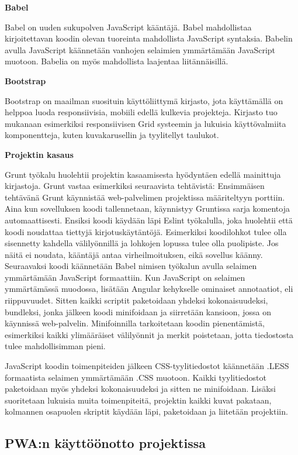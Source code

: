 \documentclass{tktltiki}
\begin{document}
\textbf{Babel}

Babel on uuden sukupolven JavaScript kääntäjä. Babel mahdollistaa kirjoitettavan koodin olevan tuoreinta mahdollista JavaScript syntaksia. Babelin avulla JavaScript käännetään vanhojen selaimien ymmärtämään JavaScript muotoon. Babelia on myös mahdollista laajentaa liitännäisillä.

\textbf{Bootstrap}

Bootstrap on maailman suosituin käyttöliittymä kirjasto, jota käyttämällä on helppoa luoda responsiivisia, mobiili edellä kulkevia projekteja. Kirjasto tuo mukanaan esimerkiksi responsiivisen Grid systeemin ja lukuisia käyttövalmiita komponentteja, kuten kuvakarusellin ja tyylitellyt taulukot. 

\textbf{Projektin kasaus}

Grunt työkalu huolehtii projektin kasaamisesta hyödyntäen edellä mainittuja kirjastoja. Grunt vastaa esimerkiksi seuraavista tehtävistä: Ensimmäisen tehtävänä Grunt käynnistää web-palvelimen projektissa määriteltyyn porttiin. Aina kun sovelluksen koodi tallennetaan, käynnistyy Gruntissa sarja komentoja automaattisesti. Ensiksi koodi käydään läpi Eslint työkalulla, joka huolehtii että koodi noudattaa tiettyjä kirjotuskäytäntöjä. Esimerkiksi koodilohkot tulee olla sisennetty kahdella välilyönnillä ja lohkojen lopussa tulee olla puolipiste. Jos näitä ei noudata, kääntäjä antaa virheilmoituksen, eikä sovellus käänny. Seuraavaksi koodi käännetään Babel nimisen työkalun avulla selaimen ymmärtämään JavaScript formaattiin. Kun JavaScript on selaimen ymmärtämässä muodossa, lisätään Angular kehykselle ominaiset annotaatiot, eli riippuvuudet. Sitten kaikki scriptit paketoidaan yhdeksi kokonaisuudeksi, bundleksi, jonka jälkeen koodi minifoidaan ja siirretään kansioon, jossa on käynnissä web-palvelin. Minifoinnilla tarkoitetaan koodin pienentämistä, esimerkiksi kaikki ylimääräiset välilyönnit ja merkit poistetaan, jotta tiedostosta tulee mahdollisimman pieni.

JavaScript koodin toimenpiteiden jälkeen CSS-tyylitiedostot käännetään .LESS formaatista selaimen ymmärtämään .CSS muotoon. Kaikki tyylitiedostot paketoidaan myös yhdeksi kokonaisuudeksi ja sitten ne minifoidaan. Lisäksi suoritetaan lukuisia muita toimenpiteitä, projektin kaikki kuvat pakataan, kolmannen osapuolen skriptit käydään läpi, paketoidaan ja liitetään projektiin.

\subsection{PWA:n käyttöönotto projektissa}
\end{document}
